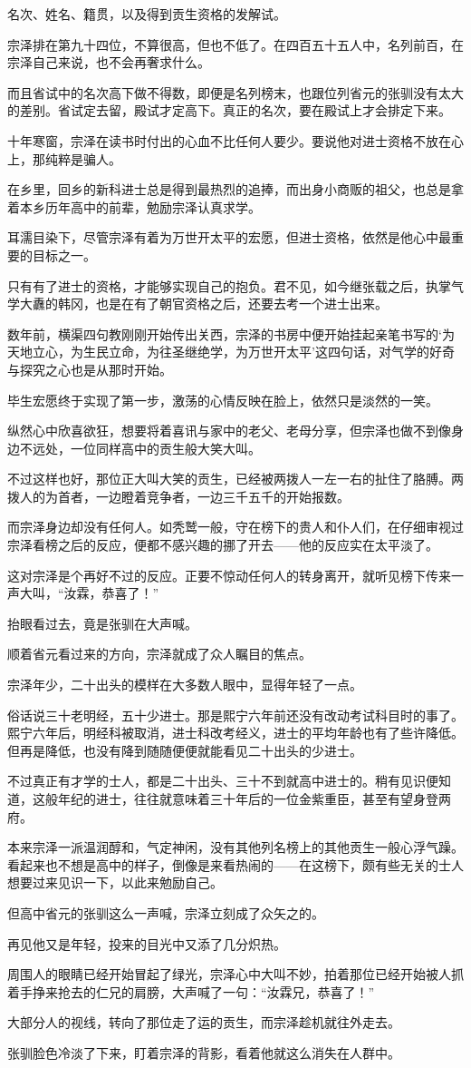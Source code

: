 名次、姓名、籍贯，以及得到贡生资格的发解试。

宗泽排在第九十四位，不算很高，但也不低了。在四百五十五人中，名列前百，在宗泽自己来说，也不会再奢求什么。

而且省试中的名次高下做不得数，即便是名列榜末，也跟位列省元的张驯没有太大的差别。省试定去留，殿试才定高下。真正的名次，要在殿试上才会排定下来。

十年寒窗，宗泽在读书时付出的心血不比任何人要少。要说他对进士资格不放在心上，那纯粹是骗人。

在乡里，回乡的新科进士总是得到最热烈的追捧，而出身小商贩的祖父，也总是拿着本乡历年高中的前辈，勉励宗泽认真求学。

耳濡目染下，尽管宗泽有着为万世开太平的宏愿，但进士资格，依然是他心中最重要的目标之一。

只有有了进士的资格，才能够实现自己的抱负。君不见，如今继张载之后，执掌气学大纛的韩冈，也是在有了朝官资格之后，还要去考一个进士出来。

数年前，横渠四句教刚刚开始传出关西，宗泽的书房中便开始挂起亲笔书写的‘为天地立心，为生民立命，为往圣继绝学，为万世开太平’这四句话，对气学的好奇与探究之心也是从那时开始。

毕生宏愿终于实现了第一步，激荡的心情反映在脸上，依然只是淡然的一笑。

纵然心中欣喜欲狂，想要将着喜讯与家中的老父、老母分享，但宗泽也做不到像身边不远处，一位同样高中的贡生般大笑大叫。

不过这样也好，那位正大叫大笑的贡生，已经被两拨人一左一右的扯住了胳膊。两拨人的为首者，一边瞪着竞争者，一边三千五千的开始报数。

而宗泽身边却没有任何人。如秃鹫一般，守在榜下的贵人和仆人们，在仔细审视过宗泽看榜之后的反应，便都不感兴趣的挪了开去——他的反应实在太平淡了。

这对宗泽是个再好不过的反应。正要不惊动任何人的转身离开，就听见榜下传来一声大叫，“汝霖，恭喜了！”

抬眼看过去，竟是张驯在大声喊。

顺着省元看过来的方向，宗泽就成了众人瞩目的焦点。

宗泽年少，二十出头的模样在大多数人眼中，显得年轻了一点。

俗话说三十老明经，五十少进士。那是熙宁六年前还没有改动考试科目时的事了。熙宁六年后，明经科被取消，进士科改考经义，进士的平均年龄也有了些许降低。但再是降低，也没有降到随随便便就能看见二十出头的少进士。

不过真正有才学的士人，都是二十出头、三十不到就高中进士的。稍有见识便知道，这般年纪的进士，往往就意味着三十年后的一位金紫重臣，甚至有望身登两府。

本来宗泽一派温润醇和，气定神闲，没有其他列名榜上的其他贡生一般心浮气躁。看起来也不想是高中的样子，倒像是来看热闹的——在这榜下，颇有些无关的士人想要过来见识一下，以此来勉励自己。

但高中省元的张驯这么一声喊，宗泽立刻成了众矢之的。

再见他又是年轻，投来的目光中又添了几分炽热。

周围人的眼睛已经开始冒起了绿光，宗泽心中大叫不妙，拍着那位已经开始被人抓着手挣来抢去的仁兄的肩膀，大声喊了一句：“汝霖兄，恭喜了！”

大部分人的视线，转向了那位走了运的贡生，而宗泽趁机就往外走去。

张驯脸色冷淡了下来，盯着宗泽的背影，看着他就这么消失在人群中。
